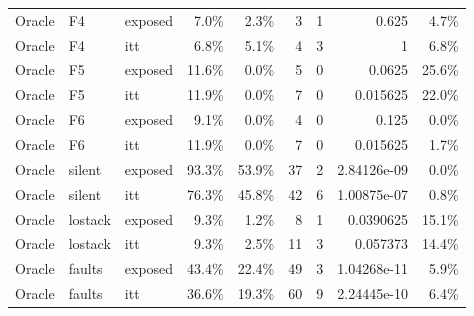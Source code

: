 \begin{tabular}{lllrrrrrr}
Oracle & F4 & exposed & 7.0\% & 2.3\% & 3 & 1 & 0.625 & 4.7\% \\
Oracle & F4 & itt & 6.8\% & 5.1\% & 4 & 3 & 1 & 6.8\% \\
Oracle & F5 & exposed & 11.6\% & 0.0\% & 5 & 0 & 0.0625 & 25.6\% \\
Oracle & F5 & itt & 11.9\% & 0.0\% & 7 & 0 & 0.015625 & 22.0\% \\
Oracle & F6 & exposed & 9.1\% & 0.0\% & 4 & 0 & 0.125 & 0.0\% \\
Oracle & F6 & itt & 11.9\% & 0.0\% & 7 & 0 & 0.015625 & 1.7\% \\
Oracle & silent & exposed & 93.3\% & 53.9\% & 37 & 2 & 2.84126e-09 & 0.0\% \\
Oracle & silent & itt & 76.3\% & 45.8\% & 42 & 6 & 1.00875e-07 & 0.8\% \\
Oracle & lostack & exposed & 9.3\% & 1.2\% & 8 & 1 & 0.0390625 & 15.1\% \\
Oracle & lostack & itt & 9.3\% & 2.5\% & 11 & 3 & 0.057373 & 14.4\% \\
Oracle & faults & exposed & 43.4\% & 22.4\% & 49 & 3 & 1.04268e-11 & 5.9\% \\
Oracle & faults & itt & 36.6\% & 19.3\% & 60 & 9 & 2.24445e-10 & 6.4\% \\
\bottomrule
\end{tabular}

